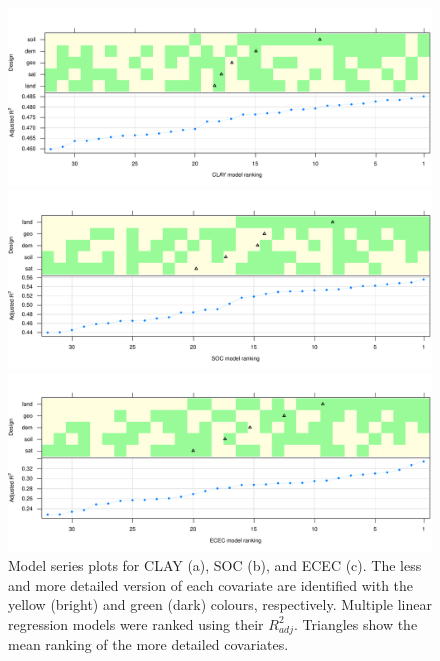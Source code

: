 \begin{figure}[!ht]
 \centering
 \begin{minipage}[b]{\textwidth}
  \subcaption{}
  \includegraphics[width=\textwidth]{fig/chap06-FIG5a}
 \end{minipage}
 \begin{minipage}[b]{\textwidth}
  \subcaption{}
  \includegraphics[width=\textwidth]{fig/chap06-FIG5b}
 \end{minipage}
 \begin{minipage}[b]{\textwidth}
  \subcaption{}
  \includegraphics[width=\textwidth]{fig/chap06-FIG5c}
 \end{minipage}
\caption[Model series plots for CLAY, SOC, and ECEC.]{Model series plots for CLAY (a), SOC (b), and ECEC (c). 
The less and more detailed version of each covariate are identified with the yellow (bright) and green (dark) 
colours, respectively. Multiple linear regression models were ranked using their ${R}^{2}_{adj}$. Triangles 
show the mean ranking of the more detailed covariates.}
\label{fig:chap06-model-series}
\end{figure}

